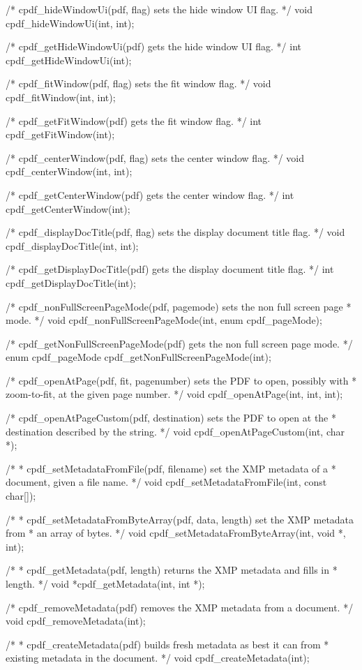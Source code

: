 /* cpdf_hideWindowUi(pdf, flag) sets the hide window UI flag. */
void cpdf_hideWindowUi(int, int);

/* cpdf_getHideWindowUi(pdf) gets the hide window UI flag. */
int cpdf_getHideWindowUi(int);

/* cpdf_fitWindow(pdf, flag) sets the fit window flag. */
void cpdf_fitWindow(int, int);

/* cpdf_getFitWindow(pdf) gets the fit window flag. */
int cpdf_getFitWindow(int);

/* cpdf_centerWindow(pdf, flag) sets the center window flag. */
void cpdf_centerWindow(int, int);

/* cpdf_getCenterWindow(pdf) gets the center window flag. */
int cpdf_getCenterWindow(int);

/* cpdf_displayDocTitle(pdf, flag) sets the display document title flag. */
void cpdf_displayDocTitle(int, int);

/* cpdf_getDisplayDocTitle(pdf) gets the display document title flag. */
int cpdf_getDisplayDocTitle(int);

/* cpdf_nonFullScreenPageMode(pdf, pagemode) sets the non full screen page
 * mode. */
void cpdf_nonFullScreenPageMode(int, enum cpdf_pageMode);

/* cpdf_getNonFullScreenPageMode(pdf) gets the non full screen page mode. */
enum cpdf_pageMode cpdf_getNonFullScreenPageMode(int);

/* cpdf_openAtPage(pdf, fit, pagenumber) sets the PDF to open, possibly with
 * zoom-to-fit, at the given page number. */
void cpdf_openAtPage(int, int, int);

/* cpdf_openAtPageCustom(pdf, destination) sets the PDF to open at the
 * destination described by the string. */
void cpdf_openAtPageCustom(int, char *);

/*
 * cpdf_setMetadataFromFile(pdf, filename) set the XMP metadata of a
 * document, given a file name.
 */
void cpdf_setMetadataFromFile(int, const char[]);

/*
 * cpdf_setMetadataFromByteArray(pdf, data, length) set the XMP metadata from
 * an array of bytes.
 */
void cpdf_setMetadataFromByteArray(int, void *, int);

/*
 * cpdf_getMetadata(pdf, length) returns the XMP metadata and fills in
 * length.
 */
void *cpdf_getMetadata(int, int *);

/* cpdf_removeMetadata(pdf) removes the XMP metadata from a document. */
void cpdf_removeMetadata(int);

/*
 * cpdf_createMetadata(pdf) builds fresh metadata as best it can from
 * existing metadata in the document.
 */
void cpdf_createMetadata(int);


